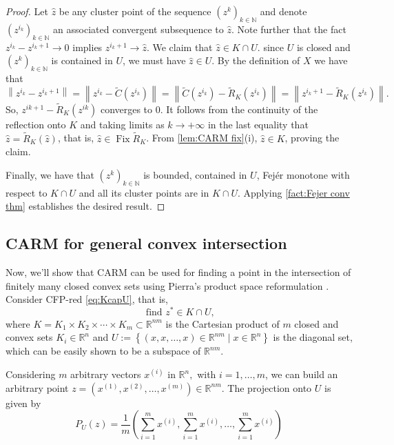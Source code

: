 \documentclass[smallextended,numbook,nospthms]{svjour3}
\theoremstyle{plain}
\theoremstyle{definition}
\def\RR{\mathds R}
\def\NN{\mathds N}
\DeclareMathOperator{\Fix}{Fix}
\begin{document}
\begin{proof}
	Let $\hat{z}$ be any cluster point of the sequence $\left(z^{k}\right)_{k \in \NN}$ and denote $\left(z^{i_{k}}\right)_{k \in \NN}$ an associated convergent subsequence to $\hat{z}$. Note further that the fact $z^{i_{k}}-z^{i_{k}+1} \rightarrow 0$ implies $z^{i_{k}+1} \rightarrow \hat{z}$. We claim that $\hat{z} \in K \cap U$. since $U$ is closed and $\left(z^{k}\right)_{k \in \NN}$ is contained in $U$, we must have $\hat{z} \in U$. By the definition of $X$ we have that
	\begin{equation}
		\left\|z^{i_{k}}-z^{i_{k}+1}\right\|=\left\|z^{i_{k}}-\tilde{C}\left(z^{i_{k}}\right)\right\|=\left\|\tilde{C}\left(z^{i_{k}}\right)-\tilde{R}_{K}\left(z^{i_{k}}\right)\right\|=\left\|z^{i_{k}+1}-\tilde{R}_{K}\left(z^{i_{k}}\right)\right\|.
	\end{equation}
	So, $z^{i k+1}-\tilde{R}_{K}\left(z^{i k}\right)$ converges to $0$. It follows from the continuity of the reflection onto $K$ and taking limits as $k \rightarrow+\infty$ in the last equality that $\hat{z}=\tilde{R}_{K}(\hat{z})$, that is, $\hat{z} \in \Fix \tilde{R}_{K}$. From  \cref{lem:CARM fix}(i), $\hat{z} \in K$, proving the claim.
	
	Finally, we have that $\left(z^{k}\right)_{k \in \NN}$ is bounded, contained in $U$, Fejér monotone with respect to $K \cap U$  and all its cluster points are in $K \cap U$. Applying \cref{fact:Fejer conv thm} establishes the desired result.
\end{proof}

\subsection{CARM for general convex intersection}

Now, we'll show that CARM can be used for finding a point in the intersection of finitely many closed convex sets using Pierra's product space reformulation \cite{Pierra:1984hl}. Consider CFP-red \cref{eq:KcapU}, that is,
\[
\text{ find } z^{*}\in K\cap U, 
\]
where $K=K_{1} \times K_{2} \times \cdots \times K_{m}\subset \RR^{nm}$ is the Cartesian product of $m$ closed and convex sets $K_{i} \in \RR^n$ and $U :=\left\{(x, x, \ldots, x) \in \RR^{nm} \mid x \in \RR^{n}\right\}$ is the diagonal set, which can be easily shown to be a subspace of $\RR^{nm}$.

Considering $m$ arbitrary vectors $x^{(i)}$ in $\RR^{n},$ with $i=1, \ldots, m$, we can build an arbitrary point $z=\left(x^{(1)}, x^{(2)}, \ldots, x^{(m)}\right) \in \RR^{nm}$. The projection onto $U$ is given by
\begin{equation}
P_{U}(z)=\frac{1}{m}\left(\sum_{i=1}^{m} x^{(i)}, \sum_{i=1}^{m} x^{(i)}, \ldots, \sum_{i=1}^{m} x^{(i)}\right)
\end{equation}
\label{Pierra P_{U}}
\end{document}
